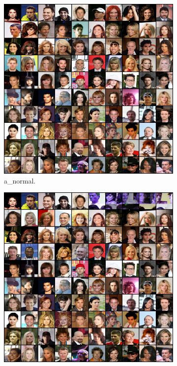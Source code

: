 \begin{figure}[!htbp]
   \centering
\begin{subfigure}[t]{0.48\textwidth}
   \includegraphics[width=\textwidth,center]{2019-05-06/celeba-bug/a_normal.png}
   \caption{a_normal.}
   \label{fig:2019-05-06_celeba-bug-a}
\end{subfigure}
\begin{subfigure}[t]{0.48\textwidth}
   \includegraphics[width=\textwidth,center]{2019-05-06/celeba-bug/b_bug.png}

\end{subfigure}
\end{figure}
